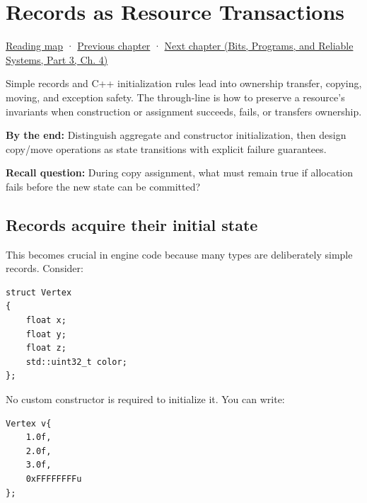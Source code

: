 \chapter{Records as Resource Transactions}\label{01-foundations-i-ch003-records-as-resource-transactions}\hypertarget{01-foundations-i-ch003}{}\label{stagechapter:01-foundations-i-ch003}

\hypertarget{01-foundations-i-ch003-records-as-resource-transactions}{}

\hyperref[volume-reading-map]{Reading map} · \hyperref[01-foundations-i-ch002-values-at-addresses-layout-lifetimes-and-representation]{Previous chapter} · \href{../01-Bits-Programs-and-Reliable-Systems-P03/main.pdf\#01-foundations-i-ch004-prove-c-ownership-with-runnable-experiments}{Next chapter (Bits, Programs, and Reliable Systems, Part 3, Ch. 4)}

Simple records and C++ initialization rules lead into ownership transfer, copying, moving, and exception safety. The through-line is how to preserve a resource's invariants when construction or assignment succeeds, fails, or transfers ownership.

\textbf{By the end:} Distinguish aggregate and constructor initialization, then design copy/move operations as state transitions with explicit failure guarantees.

\textbf{Recall question:} During copy assignment, what must remain true if allocation fails before the new state can be committed?

\section{Records acquire their initial state}\label{01-foundations-i-ch003-records-acquire-their-initial-state}

\hypertarget{01-foundations-i-ch003-records-acquire-their-initial-state}{}

This becomes crucial in engine code because many types are deliberately simple records. Consider:

\begin{verbatim}
struct Vertex
{
    float x;
    float y;
    float z;
    std::uint32_t color;
};
\end{verbatim}

No custom constructor is required to initialize it. You can write:

\begin{verbatim}
Vertex v{
    1.0f,
    2.0f,
    3.0f,
    0xFFFFFFFFu
};
\end{verbatim}

